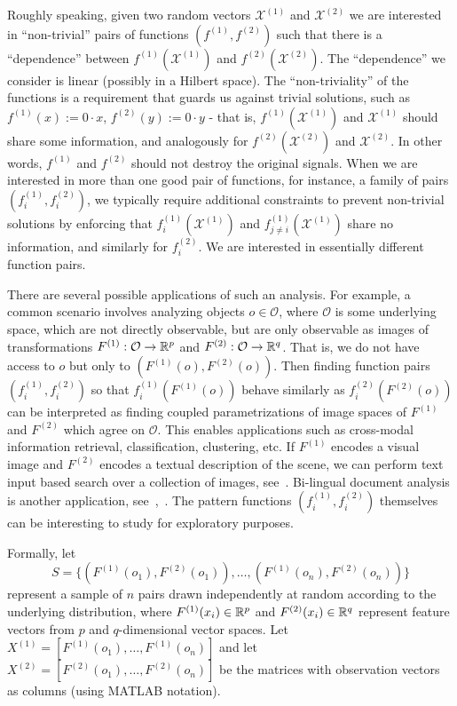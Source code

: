Roughly speaking, given two random vectors $\mathcal{X}^{(1)}$ and $\mathcal{X}^{(2)}$
we are interested in ``non-trivial'' pairs of functions $(f^{(1)},f^{(2)})$ such that
there is a ``dependence'' between $f^{(1)}(\mathcal{X}^{(1)})$ and $f^{(2)}(\mathcal{X}^{(2)})$.
The ``dependence'' we consider is linear (possibly in a Hilbert space). The ``non-triviality''
of the functions is a requirement that guards us against trivial solutions, such
as $f^{(1)}(x) := 0 \cdot x$, $f^{(2)}(y) := 0 \cdot y$ - that is,
$f^{(1)}(\mathcal{X}^{(1)})$ and $\mathcal{X}^{(1)}$ should share some information,
and analogously for $f^{(2)}(\mathcal{X}^{(2)})$ and $\mathcal{X}^{(2)}$. In other words,
$f^{(1)}$ and $f^{(2)}$ should not destroy the original signals. When we are interested
in more than one good pair of functions, for instance, a family of pairs $(f_i^{(1)},f_i^{(2)})$,
we typically require additional constraints to prevent non-trivial solutions by enforcing that
$f_i^{(1)}\left(\mathcal{X}^{(1)}\right)$ and $f^{(1)}_{j \neq i}\left(\mathcal{X}^{(1)}\right)$
share no information, and similarly for $f^{(2)}_i$. We are interested in essentially
different function pairs.

There are several possible applications of such an analysis. For example, a common scenario
involves analyzing objects $o \in \mathcal{O}$, where $\mathcal{O}$ is some underlying space,
which are not directly observable, but are only observable as images of transformations
$F^{(1)}: \mathcal{O} \rightarrow \mathbb{R}^p$ and $F^{(2)}: \mathcal{O} \rightarrow \mathbb{R}^q$. That is,
we do not have access to $o$ but only to $\left(F^{(1)}(o), F^{(2)}(o)\right)$. Then finding
function pairs $(f^{(1)}_i, f^{(2)}_i)$ so that $f^{(1)}_i(F^{(1)}(o))$ behave similarly as $f^{(2)}_i(F^{(2)}(o))$
can be interpreted as finding coupled parametrizations of image spaces of $F^{(1)}$ and $F^{(2)}$ which
agree on $\mathcal{O}$. This enables applications such as cross-modal information retrieval,
classification, clustering, etc. If $F^{(1)}$ encodes a visual image and $F^{(2)}$ encodes a
textual description of the scene, we can perform text input based search over a collection
of images, see~\cite{HardoonCCA}. Bi-lingual document analysis is another application,
see~\cite{vinokourov2002inferring},~\cite{mrpqr}. The pattern functions $(f^{(1)}_i, f^{(2)}_i)$
themselves can be interesting to study for exploratory purposes.

Formally, let
$$ S = \{ \left( F^{(1)}(o_1), F^{(2)}(o_1) \right), \ldots, \left( F^{(1)}(o_n), F^{(2)}(o_n) \right) \} $$
represent a sample of $n$ pairs drawn independently at random according to the underlying distribution,
where $F^{(1)}(x_i) \in \mathbb{R}^p$ and $F^{(2)}(x_i) \in \mathbb{R}^q$ represent feature vectors from $p$ and $q$-dimensional
vector spaces. Let $X^{(1)}=[F^{(1)}(o_1), \ldots, F^{(1)}(o_n)]$ and let $X^{(2)}=[F^{(2)}(o_1), \ldots ,F^{(2)}(o_n)]$ be the matrices
with observation vectors as columns (using MATLAB notation).

